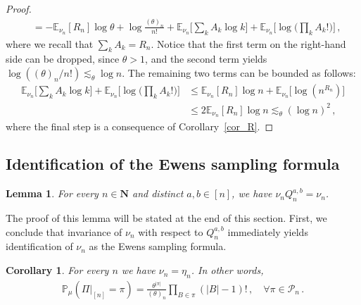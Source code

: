 \documentclass[a4paper,11pt]{article}
\newcommand{\NN}{\mathbf{N}}
\newcommand{\EE}{\mathbb{E}}
\newcommand{\PP}{\mathbb{P}}
\newcommand{\mP}{\mathcal{P}}
\numberwithin{equation}{section}
\newtheorem{lemma}[theorem]{Lemma}
\newtheorem{corollary}[theorem]{Corollary}
\begin{document}
\begin{proof}
\begin{equation*}
\begin{aligned}
 & = 
 - \EE_{\nu_{n}}[ R_{n}] \log{ \theta} 
 + \log{\frac{( \theta)_{n}}{n!}} 
 + \EE_{\nu_{n}}\bigg[ \sum_{k}A_{k} \log{k}  \bigg]
 + \EE_{\nu_{n}}\bigg[  \log{\Big( \prod_{k}A_{k}!\Big)}  \bigg]\,,
\end{aligned}
\end{equation*}
where we recall that $ \sum_{k} A_{k} = R_{n}$.
Notice that the first term on the right-hand side can be dropped, since $ \theta>1$, and the second term yields $ \log{((\theta)_{n}/ n!)} \lesssim_{\theta} \log{n} $. The remaining two terms can be bounded as follows:
\begin{equation*}
\begin{aligned}
\EE_{\nu_{n}}\bigg[ \sum_{k}A_{k} \log{k}  \bigg]
 + \EE_{\nu_{n}}\bigg[  \log{\Big( \prod_{k}A_{k}!\Big)}  \bigg]
 &\leqslant \EE_{\nu_{n}}[ R_{n}] \log{n} 
 + \EE_{\nu_{n}}\big[  \log{(n^{R_{n}})} \big]\\
 & \leqslant 2 \EE_{\nu_{n}}[ R_{n}] \log{n} 
 \lesssim_{\theta} ( \log{n} )^{2}\,,
\end{aligned}
\end{equation*}
where the final step is  a consequence of Corollary~\ref{cor_R}.
\end{proof}



\subsection{Identification of the Ewens sampling formula}


\begin{lemma}\label{lem_nuQ_inv}
	For every $n \in \NN$ and distinct $ a,b \in [n]$, we have $\nu _{n} Q^{a,b}_{n}= \nu_{n}$.
\end{lemma}

The proof of this lemma will be stated at the end of this section. 
First, we conclude that invariance of $\nu_n$ with respect to $ Q_{n}^{a,b}$ immediately yields identification of $ \nu_{n}$ as the Ewens sampling formula.


\begin{corollary}\label{cor_main}
For every $n $ we have $ \nu_{n}= \eta_{n}$. In other words, 
\begin{equation}
\begin{aligned}
\PP_{\mu}( \Pi|_{[n]}= \pi)
=
\frac{
\theta^{|\pi|}}{
( \theta)_{n}}
\prod_{B \in \pi}(|B|-1)!\,, \quad \forall \pi \in \mP_{n}\,.
\end{aligned}
\end{equation}
\end{corollary}
\end{document}
